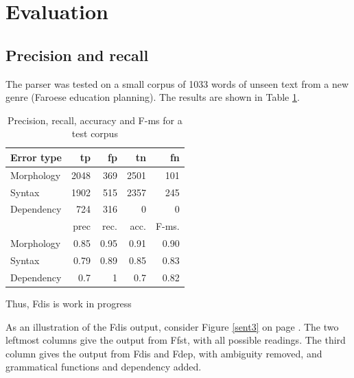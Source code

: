 \documentclass[11pt]{article}
\begin{document}
\section{Evaluation}
\subsection{Precision and recall}

The parser was tested on a small corpus of 1033 words of unseen text from a new genre (Faroese education planning). The results are shown in Table \ref{prec}.


\begin{table}[htbp]
\caption{Precision, recall, accuracy and F-ms for a test corpus}
\begin{center}
\begin{tabular}{|l|r|r|r|r|}
\hline
Error type	& tp		& fp		& tn		& fn	\\
\hline
Morphology  &  2048  &  369  &  2501  &  101 \\ 
Syntax  &  1902  &  515  &  2357  &  245 \\  
Dependency &  724  &  316  &  0  &  0 \\
\hline
\hline
 & prec	 & rec.	& acc.	& F-ms. \\
\hline
Morphology    &  0.85  &  0.95  &  0.91  &  0.90 \\
Syntax    &  0.79  &  0.89  &  0.85  &  0.83 \\
Dependency  &  0.7  &  1  &  0.7  &  0.82 \\
\hline
\end{tabular}
\end{center}
\label{prec}
\end{table}%


Thus, Fdis is work in progress 

As an illustration of the Fdis output, consider Figure \ref{sent3} on page \pageref{sent3}. The two leftmost columns give the output from Ffst, with all possible readings. The third column gives the output from Fdis and Fdep, with ambiguity removed, and grammatical functions and dependency added.
\end{document}

